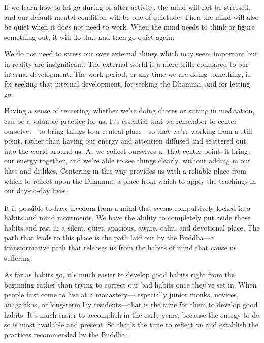 If we learn how to let go during or after activity, the mind will not 
be stressed, and our default mental condition will be one of quietude. 
Then the mind will also be quiet when it does not need to work. When 
the mind needs to think or figure something out, it will do that and 
then go quiet again.

We do not need to stress out over external things which may seem 
important but in reality are insignificant. The external world is a 
mere trifle compared to our internal development. The work period, or 
any time we are doing something, is for seeking that internal 
development, for seeking the Dhamma, and for letting go.


Having a sense of centering, whether we're doing chores or sitting in 
meditation, can be a valuable practice for us. It's essential that we 
remember to center ourselves---to bring things to a central place---so 
that we're working from a still point, rather than having our energy 
and attention diffused and scattered out into the world around us. As 
we collect ourselves at that center point, it brings our energy 
together, and we're able to see things clearly, without adding in our 
likes and dislikes. Centering in this way provides us with a reliable 
place from which to reflect upon the Dhamma, a place from which to 
apply the teachings in our day-to-day lives.


It is possible to have freedom from a mind that seems compulsively 
locked into habits and mind movements. We have the ability to 
completely put aside those habits and rest in a silent, quiet, 
spacious, aware, calm, and devotional place. The path that leads to 
this place is the path laid out by the Buddha---a transformative path 
that releases us from the habits of mind that cause us suffering.

As far as habits go, it's much easier to develop good habits right from 
the beginning rather than trying to correct our bad habits once they've 
set in. When people first come to live at a monastery--- especially 
junior monks, novices, anagārikas, or long-term lay residents---that 
is the time for them to develop good habits. It's much easier to 
accomplish in the early years, because the energy to do so is most 
available and present. So that's the time to reflect on and establish 
the practices recommended by the Buddha.

